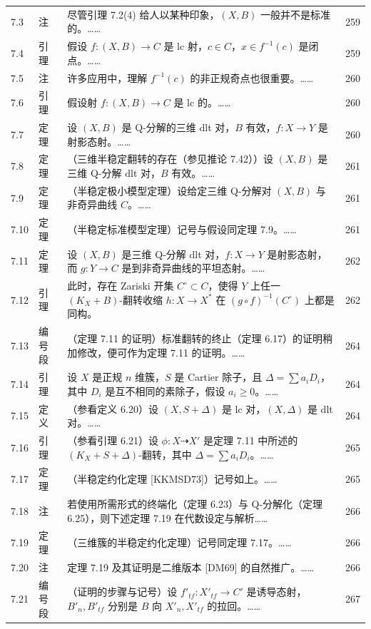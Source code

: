 \begin{longtable}{@{}p{}p{}p{}p{}@{}}
7.3 & 注 & 尽管引理 7.2(4) 给人以某种印象，$(X,B)$ 一般并不是标准的。…… & 259 \\
7.4 & 引理 & 假设 $f\colon(X,B)\to C$ 是 lc 射，$c\in C$，$x\in f^{-1}(c)$ 是闭点。…… & 259 \\
7.5 & 注 & 许多应用中，理解 $f^{-1}(c)$ 的非正规奇点也很重要。…… & 260 \\
7.6 & 引理 & 假设射 $f\colon(X,B)\to C$ 是 lc 的。…… & 260 \\
7.7 & 定理 & 设 $(X,B)$ 是 Q-分解的三维 dlt 对，$B$ 有效，$f\colon X\to Y$ 是射影态射。…… & 260 \\
7.8 & 定理 & （三维半稳定翻转的存在（参见推论 7.42））设 $(X,B)$ 是三维 Q-分解 dlt 对，$B$ 有效。…… & 261 \\
7.9 & 定理 & （半稳定极小模型定理）设给定三维 Q-分解对 $(X,B)$ 与非奇异曲线 $C$。…… & 261 \\
7.10 & 定理 & （半稳定标准模型定理）记号与假设同定理 7.9。…… & 261 \\
7.11 & 定理 & 设 $(X,B)$ 是三维 Q-分解 dlt 对，$f\colon X\to Y$ 是射影态射，而 $g\colon Y\to C$ 是到非奇异曲线的平坦态射。…… & 262 \\
7.12 & 引理 & 此时，存在 Zariski 开集 $C^\circ\subset C$，使得 $Y$ 上任一 $(K_X+B)$-翻转收缩 $h\colon X\to X^*$ 在 $(g\circ f)^{-1}(C^\circ)$ 上都是同构。 & 262 \\
7.13 & 编号段 & （定理 7.11 的证明）\quad 标准翻转的终止（定理 6.17）的证明稍加修改，便可作为定理 7.11 的证明。…… & 264 \\
7.14 & 引理 & 设 $X$ 是正规 $n$ 维簇，$S$ 是 Cartier 除子，且 $\Delta=\sum a_iD_i$，其中 $D_i$ 是互不相同的素除子，假设 $a_i\ge0$。…… & 264 \\
7.15 & 定义 & （参看定义 6.20）设 $(X,S+\Delta)$ 是 lc 对，$(X,\Delta)$ 是 dlt 对。…… & 264 \\
7.16 & 引理 & （参看引理 6.21）设 $\phi\colon X\dashrightarrow X'$ 是定理 7.11 中所述的 $(K_X+S+\Delta)$-翻转，其中 $\Delta=\sum a_iD_i$。…… & 265 \\
7.17 & 定理 & （半稳定约化定理 [KKMSD73]）记号如上。…… & 265 \\
7.18 & 注 & 若使用所需形式的终端化（定理 6.23）与 Q-分解化（定理 6.25），则下述定理 7.19 在代数设定与解析…… & 266 \\
7.19 & 定理 & （三维簇的半稳定约化定理）记号同定理 7.17。…… & 266 \\
7.20 & 注 & 定理 7.19 及其证明是二维版本 [DM69] 的自然推广。…… & 266 \\
7.21 & 编号段 & （证明的步骤与记号）\quad 设 $f'_{tf}\colon X'_{tf}\to C'$ 是诱导态射，$B'_n,B'_{tf}$ 分别是 $B$ 向 $X'_n,X'_{tf}$ 的拉回。…… & 267 \\

\end{longtable}
